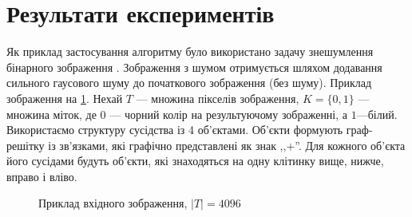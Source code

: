 \section{Результати експериментів}

Як приклад застосування алгоритму було використано задачу знешумлення бінарного зображення 
\cite{Boykov,Boykov_2,comp_vision,Greig_port}. Зображення з шумом отримується шляхом додавання сильного
гаусового шуму до початкового зображення (без шуму). Приклад зображення на \ref{fig:a2_original}.
Нехай $T$ --- множина пікселів зображення, $K=\{0,1\}$ --- множина міток, де $0$ --- чорний колір 
на результуючому зображенні, а $1$---білий. Використаємо структуру 
сусідства із 4 об'єктами. Об'єкти формують граф-решітку із зв'язками, які графічно представлені як знак ,,$+$''.
Для кожного об'єкта його сусідами будуть об'єкти, які знаходяться на одну клітинку вище, нижче, вправо і вліво.
\begin{figure}[h]
    \centering
    \qquad
    \caption{Приклад вхідного зображення, $|T|=4096$}%
    \label{fig:a2_original}
\end{figure}

